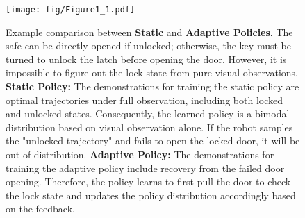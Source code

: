 \begin{figure}
  \texttt{[image: fig/Figure1\_1.pdf]}
  \caption{Example comparison between \textbf{Static} and \textbf{Adaptive Policies}. The safe can be directly opened if unlocked; otherwise, the key must be turned to unlock the latch before opening the door.
  However, it is impossible to figure out the lock state from pure visual observations.
  \textbf{Static Policy:} The demonstrations for training the static policy are optimal trajectories under full observation, including both locked and unlocked states. Consequently, the learned policy is a bimodal distribution based on visual observation alone. If the robot samples the "unlocked trajectory" and fails to open the locked door, it will be out of distribution. \textbf{Adaptive Policy:} The demonstrations for training the adaptive policy include recovery from the failed door opening. Therefore, the policy learns to first pull the door to check the lock state and updates the policy distribution accordingly based on the feedback.
  }
  \label{fig:fig1}
  \vspace{-0.3cm}
\end{figure}
